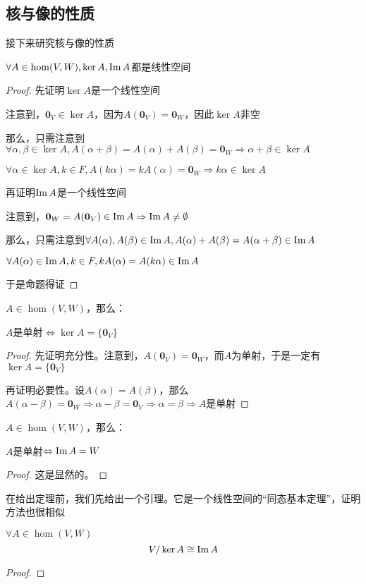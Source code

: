 \documentclass[12pt, a4paper, oneside, UTF8]{ctexbook}
\begin{document}
			\subsection{核与像的性质}
				接下来研究核与像的性质
				\begin{para}{0}
					\point{}
						\begin{proposition}
							$\forall A \in \hom(V,W),\ker A,\operatorname{Im} A$都是线性空间
						\end{proposition}
						\begin{proof}
							先证明$\ker A$是一个线性空间

							注意到，$\mathbf{0}_V \in \ker A$，因为$A(\mathbf{0}_V)=\mathbf{0}_W$，因此$\ker A$非空

							那么，只需注意到$\forall \alpha ,\beta \in \ker A,A(\alpha +\beta )=A(\alpha )+A(\beta )=\mathbf{0}_{W} \Rightarrow \alpha + \beta \in \ker A$

							$\forall \alpha \in \ker A,k \in F,A(k\alpha )=kA(\alpha )=\mathbf{0}_W \Rightarrow k\alpha \in \ker A$

							再证明$\operatorname{Im} A$是一个线性空间

							注意到，$\mathbf{0}_W = A(\mathbf{0}_V) \in \operatorname{Im} A \Rightarrow \operatorname{Im} A \neq \emptyset$

							那么，只需注意到$\forall A(\alpha) ,A(\beta) \in \operatorname{Im} A,A(\alpha )+A(\beta )=A(\alpha +\beta )\in \operatorname{Im} A$

							$\forall A(\alpha )\in \operatorname{Im} A,k \in F,kA(\alpha )=A(k\alpha )\in \operatorname{Im} A$

							于是命题得证
						\end{proof}
					\point{}
						\begin{proposition}
							$A \in \hom(V,W)$，那么：

							$A$是单射$\Leftrightarrow \ker A = \{\mathbf{0}_V\}$
						\end{proposition}
						\begin{proof}
							先证明充分性。注意到，$A(\mathbf{0}_V)=\mathbf{0}_W$，而$A$为单射，于是一定有$\ker A = \{\mathbf{0}_V\}$

							再证明必要性。设$A(\alpha )=A(\beta )$，那么$A(\alpha -\beta )=\mathbf{0}_W \Rightarrow \alpha -\beta =\mathbf{0}_V \Rightarrow \alpha =\beta \Rightarrow A$是单射
						\end{proof}
						\point{}
						\begin{proposition}
							$A \in \hom(V,W)$，那么：

							$A$是单射$\Leftrightarrow \operatorname{Im} A = W$
						\end{proposition}
						\begin{proof}
							这是显然的。
						\end{proof}
						在给出定理前，我们先给出一个引理。它是一个线性空间的“同态基本定理”，证明方法也很相似
						\begin{lemma}{}{}
							$\forall A \in \hom(V,W)$
							\begin{equation}
								V/\ker A \cong \operatorname{Im} A
							\end{equation}
						\end{lemma}
						\begin{proof}
							

\end{proof}
\end{para}
\end{document}
